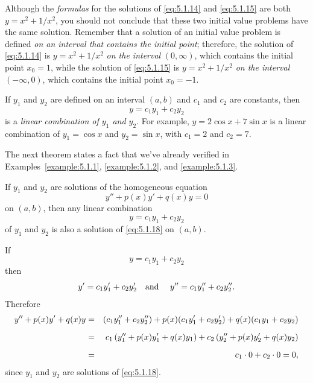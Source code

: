 \begin{examplesolution}
Although the {\color{blue}\it formulas\/} for the solutions of \eqref{eq:5.1.14} and
\eqref{eq:5.1.15} are both $y=x^{2}+1/x^{2}$, you should not conclude that these two initial value
problems have the same solution. Remember that a solution of an initial value problem is defined
{\color{blue}\it on an interval that contains the initial point\/}; therefore, the solution of
\eqref{eq:5.1.14} is $y=x^{2}+1/x^{2}$ {\color{blue}\it on the interval\/} $(0,\infty)$, which
contains the initial point $x_{0}=1$, while the solution of \eqref{eq:5.1.15} is $y=x^{2}+1/x^{2}$
{\color{blue}\it on the interval\/} $(-\infty,0)$, which contains the initial point $x_{0}=-1$.
\end{examplesolution}


\noindent
If $y_{1}$ and $y_{2}$ are defined on an interval $(a,b)$ and $c_{1}$ and $c_{2}$ are constants,
then
\[
  y=c_{1}y_{1}+c_{2}y_{2}
\]
is a {\color{blue}\it linear combination of $y_{1}$ and $y_{2}$\/}. For example, $y=2\cos x+7\sin x$
is a linear combination of $y_{1}= \cos x$ and $y_{2}=\sin x$, with $c_{1}=2$ and $c_{2}=7$.

The next theorem states a fact that we've already verified in Examples~\ref{example:5.1.1},
\ref{example:5.1.2}, and \ref{example:5.1.3}.

\begin{theorem}
  \color{blue}
  \label{thmtype:5.1.2} If $y_{1}$ and $y_{2}$ are solutions of the homogeneous equation
  \begin{equation}
    \label{eq:5.1.18}y''+p(x)y'+q(x)y=0
  \end{equation}
  on $(a,b)$, then any linear combination
  \begin{equation}
    \label{eq:5.1.19}y=c_{1}y_{1}+c_{2}y_{2}
  \end{equation}
  of $y_{1}$ and $y_{2}$ is also a solution of \eqref{eq:5.1.18} on $(a,b)$.
\end{theorem}

\proof If
\[
  y=c_{1}y_{1}+c_{2}y_{2}
\]
then
\[
  y'=c_{1}y_{1}'+c_{2}y_{2}'\mbox{\quad and \quad}y''=c_{1}y_{1}''+c_{2}y_{2}''.
\]
Therefore
\begin{eqnarray*}
  y''+p(x)y'+q(x)y & = & (c_{1}y_{1}''+c_{2}y_{2}'')+p(x)(c_{1}y_{1}'+c_{2}y_{2}')+q(x)(c_{1}y_{1}+c_{2}y_{2})         \\[2\jot]
                   & = & c_{1}\left(y_{1}''+p(x)y_{1}'+q(x)y_{1}\right)+c_{2}\left(y_{2}''+p(x)y_{2}'+q(x)y_{2}\right) \\[2\jot]
                   & = & c_{1}\cdot0+c_{2}\cdot0=0,
\end{eqnarray*}
since $y_{1}$ and $y_{2}$ are solutions of \eqref{eq:5.1.18}. \bbox

